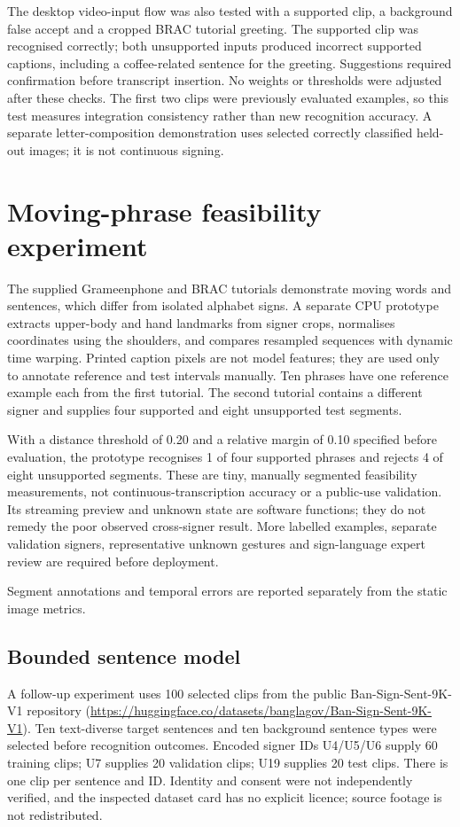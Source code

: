 \documentclass[11pt,a4paper]{article}
\begin{document}
The desktop video-input flow was also tested with a supported clip, a background false accept and a cropped BRAC tutorial greeting. The supported clip was recognised correctly; both unsupported inputs produced incorrect supported captions, including a coffee-related sentence for the greeting. Suggestions required confirmation before transcript insertion. No weights or thresholds were adjusted after these checks. The first two clips were previously evaluated examples, so this test measures integration consistency rather than new recognition accuracy. A separate letter-composition demonstration uses selected correctly classified held-out images; it is not continuous signing.

\section{Moving-phrase feasibility experiment}
The supplied Grameenphone and BRAC tutorials demonstrate moving words and sentences, which differ from isolated alphabet signs. A separate CPU prototype extracts upper-body and hand landmarks from signer crops, normalises coordinates using the shoulders, and compares resampled sequences with dynamic time warping. Printed caption pixels are not model features; they are used only to annotate reference and test intervals manually. Ten phrases have one reference example each from the first tutorial. The second tutorial contains a different signer and supplies four supported and eight unsupported test segments.

With a distance threshold of 0.20 and a relative margin of 0.10 specified before evaluation, the prototype recognises 1 of four supported phrases and rejects 4 of eight unsupported segments. These are tiny, manually segmented feasibility measurements, not continuous-transcription accuracy or a public-use validation. Its streaming preview and unknown state are software functions; they do not remedy the poor observed cross-signer result. More labelled examples, separate validation signers, representative unknown gestures and sign-language expert review are required before deployment.

Segment annotations and temporal errors are reported separately from the static image metrics.

\subsection{Bounded sentence model}
A follow-up experiment uses 100 selected clips from the public Ban-Sign-Sent-9K-V1 repository (\url{https://huggingface.co/datasets/banglagov/Ban-Sign-Sent-9K-V1}). Ten text-diverse target sentences and ten background sentence types were selected before recognition outcomes. Encoded signer IDs U4/U5/U6 supply 60 training clips; U7 supplies 20 validation clips; U19 supplies 20 test clips. There is one clip per sentence and ID. Identity and consent were not independently verified, and the inspected dataset card has no explicit licence; source footage is not redistributed.
\end{document}
